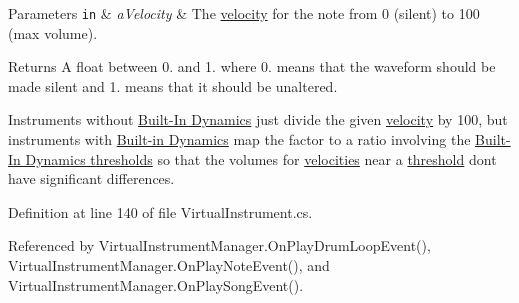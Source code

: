 \begin{DoxyParams}[1]{Parameters}
\mbox{\tt in}  & {\em a\+Velocity} & The \hyperlink{group___audio_DefVel}{velocity} for the note from 0 (silent) to 100 (max volume). \\
\hline
\end{DoxyParams}
\begin{DoxyReturn}{Returns}
A float between 0. and 1. where 0. means that the waveform should be made silent and 1. means that it should be unaltered.
\end{DoxyReturn}
Instruments without \hyperlink{group___audio_DefBID}{Built-\/\+In Dynamics} just divide the given \hyperlink{group___audio_DefVel}{velocity} by 100, but instruments with \hyperlink{group___audio_DefBID}{Built-\/in Dynamics} map the factor to a ratio involving the \hyperlink{group___audio_DefBIDThresh}{Built-\/\+In Dynamics thresholds} so that the volumes for \hyperlink{group___audio_DefVel}{velocities} near a \hyperlink{group___audio_DefBIDThresh}{threshold} don\textquotesingle{}t have significant differences. 

Definition at line 140 of file Virtual\+Instrument.\+cs.



Referenced by Virtual\+Instrument\+Manager.\+On\+Play\+Drum\+Loop\+Event(), Virtual\+Instrument\+Manager.\+On\+Play\+Note\+Event(), and Virtual\+Instrument\+Manager.\+On\+Play\+Song\+Event().


